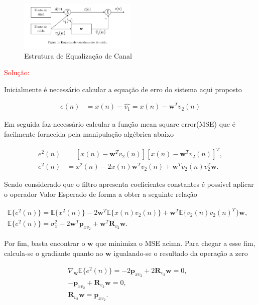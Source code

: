 \documentclass[a4paper,10pt]{article}
\begin{document}
\begin{enumerate}
				\begin{figure}[!ht]
					\centering
					\includegraphics[width=0.5\textwidth]{figs/cancelamento_ruido.png}
					\caption{Estrutura de Equalização de Canal}
				\end{figure}
				
				\textcolor{red}{Solução:}
				
				Inicialmente é necessário calcular a equação de erro do sistema aqui proposto
				
				\begin{align}
					e(n) &= x(n) - \hat{v_{1}} = x(n) - \mathbf{w}^{T}v_{2}(n)
				\end{align}
				
				Em seguida faz-necessário calcular a função mean square error(MSE) que é facilmente fornecida pela manipulação algébrica abaixo
				
				\begin{align}
					e^{2}(n) &= [x(n) - \mathbf{w}^{T}v_{2}(n)][x(n) - \mathbf{w}^{T}v_{2}(n)]^{T}, \\
					e^{2}(n) &= x^{2}(n) - 2x(n)\mathbf{w}^{T}v_{2}(n) + \mathbf{w}^{T}v_{2}(n)v_{2}^{T}\mathbf{w}.
				\end{align}
				
				Sendo considerado que o filtro apresenta coeficientes constantes é possível aplicar o operador Valor Esperado de forma a obter a seguinte relação
				
				\begin{align}
					\mathbb{E}\{e^{2}(n)\} = \mathbb{E}\{x^{2}(n)\} - 2\mathbf{w}^{T}\mathbb{E}\{x(n) v_{2}(n)\} + \mathbf{w}^{T}\mathbb{E}\{v_{2}(n)v_{2}(n)^{T}\} \mathbf{w},& \\
					\mathbb{E}\{e^{2}(n)\} = \sigma^{2}_{x} - 2\mathbf{w}^{T}\mathbf{p}_{xv_{2}} + \mathbf{w}^{T}\mathbf{R}_{v_{2}} \mathbf{w}.&
				\end{align}
				
				Por fim, basta encontrar o $\mathbf{w}$ que minimiza o MSE acima. Para chegar a esse fim, calcula-se o gradiante quanto ao $\mathbf{w}$ igualando-se o resultado da operação a zero
				
				\begin{align}
					\nabla_{\mathbf{w}} \mathbb{E}\{e^{2}(n)\} = - 2\mathbf{p}_{xv_{2}} + 2\mathbf{R}_{v_{2}} \mathbf{w} = 0,& \\
					-\mathbf{p}_{xv_{2}} + \mathbf{R}_{v_{2}} \mathbf{w} = 0,& \\
					\mathbf{R}_{v_{2}} \mathbf{w} = \mathbf{p}_{xv_{2}}.&
				\end{align}
				

\end{enumerate}
\end{document}
